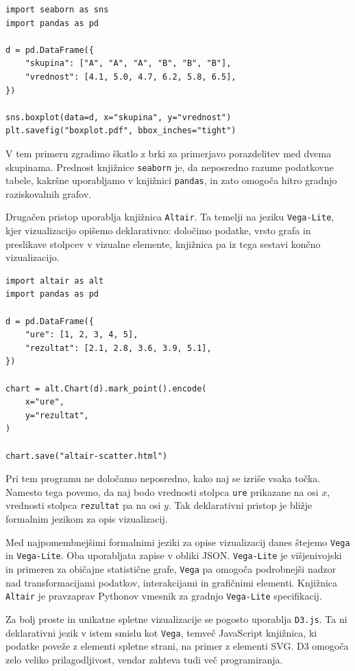 \vspace*{3mm}
\begin{lstlisting}
import seaborn as sns
import pandas as pd

d = pd.DataFrame({
    "skupina": ["A", "A", "A", "B", "B", "B"],
    "vrednost": [4.1, 5.0, 4.7, 6.2, 5.8, 6.5],
})

sns.boxplot(data=d, x="skupina", y="vrednost")
plt.savefig("boxplot.pdf", bbox_inches="tight")
\end{lstlisting}

V tem primeru zgradimo škatlo z brki za primerjavo porazdelitev med dvema
skupinama. Prednost knjižnice \texttt{seaborn} je, da neposredno razume podatkovne
tabele, kakršne uporabljamo v knjižnici \texttt{pandas}, in zato omogoča hitro
gradnjo raziskovalnih grafov.

Drugačen pristop uporablja knjižnica \texttt{Altair}. Ta temelji na jeziku
\texttt{Vega-Lite}, kjer vizualizacijo opišemo deklarativno: določimo podatke,
vrsto grafa in preslikave stolpcev v vizualne elemente, knjižnica pa iz tega
sestavi končno vizualizacijo.

\vspace*{3mm}
\begin{lstlisting}
import altair as alt
import pandas as pd

d = pd.DataFrame({
    "ure": [1, 2, 3, 4, 5],
    "rezultat": [2.1, 2.8, 3.6, 3.9, 5.1],
})

chart = alt.Chart(d).mark_point().encode(
    x="ure",
    y="rezultat",
)

chart.save("altair-scatter.html")
\end{lstlisting}

Pri tem programu ne določamo neposredno, kako naj se izriše vsaka točka.
Namesto tega povemo, da naj bodo vrednosti stolpca \texttt{ure} prikazane na osi
\(x\), vrednosti stolpca \texttt{rezultat} pa na osi \(y\). Tak deklarativni
pristop je bližje formalnim jezikom za opis vizualizacij.

Med najpomembnejšimi formalnimi jeziki za opise vizualizacij danes štejemo \texttt{Vega} in \texttt{Vega-Lite}.
Oba uporabljata zapise v obliki JSON. \texttt{Vega-Lite} je višjenivojski in
primeren za običajne statistične grafe, \texttt{Vega} pa omogoča podrobnejši
nadzor nad transformacijami podatkov, interakcijami in grafičnimi elementi.
Knjižnica \texttt{Altair} je pravzaprav Pythonov vmesnik za gradnjo
\texttt{Vega-Lite} specifikacij.

Za bolj proste in unikatne spletne vizualizacije se pogosto uporablja
\texttt{D3.js}. Ta ni deklarativni jezik v istem smislu kot \texttt{Vega}, temveč
JavaScript knjižnica, ki podatke poveže z elementi spletne strani, na primer z
elementi SVG. D3 omogoča zelo veliko prilagodljivost, vendar zahteva tudi več
programiranja.

